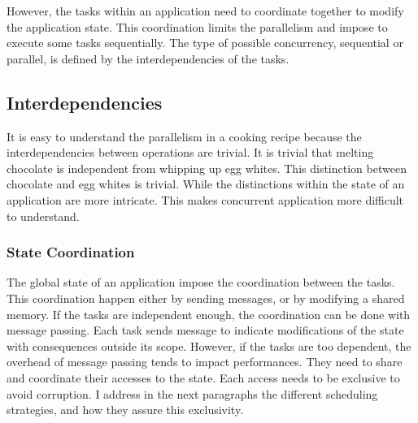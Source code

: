 However, the tasks within an application need to coordinate together to modify the application state.
This coordination limits the parallelism and impose to execute some tasks sequentially.
The type of possible concurrency, sequential or parallel, is defined by the interdependencies of the tasks.


\subsection{Interdependencies}

It is easy to understand the parallelism in a cooking recipe because the interdependencies between operations are trivial.
It is trivial that melting chocolate is independent from whipping up egg whites.
This distinction between chocolate and egg whites is trivial.
While the distinctions within the state of an application are more intricate.
This makes concurrent application more difficult to understand.

\subsubsection{State Coordination}

The global state of an application impose the coordination between the tasks.
This coordination happen either by sending messages, or by modifying a shared memory.
If the tasks are independent enough, the coordination can be done with message passing.
Each task sends message to indicate modifications of the state with consequences outside its scope.
However, if the tasks are too dependent, the overhead of message passing tends to impact performances.
They need to share and coordinate their accesses to the state.
Each access needs to be exclusive to avoid corruption.
I address in the next paragraphs the different scheduling strategies, and how they assure this exclusivity.

